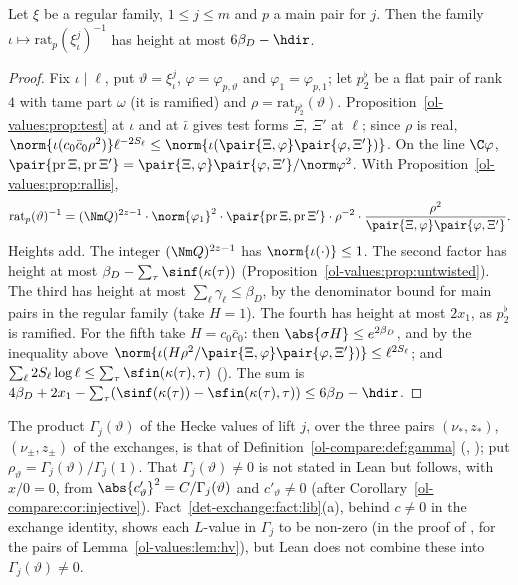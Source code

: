 \begin{theorem}\label{ol-values:thm:invratio}
Let $\xi$ be a regular family, $1\le j\le m$ and $p$ a main pair for $j$. Then the family
$\iota\mapsto\mathrm{rat}_p(\xi_\iota^j)^{-1}$ has height at most $6\beta_D-\hdir$.
\end{theorem}

\begin{proof}
Fix $\iota\mid\ell$, put $\vartheta=\xi_\iota^j$, $\varphi=\varphi_{p,\vartheta}$ and
$\varphi_1=\varphi_{p,1}$; let $p^\flat_2$ be a flat pair of rank $4$ with tame part $\omega$ (it is
ramified) and
$\rho=\mathrm{rat}_{p^\flat_2}(\vartheta)$. Proposition~\ref{ol-values:prop:test} at $\iota$ and at
$\bar\iota$ gives test forms $\Xi$, $\Xi'$ at $\ell$; since $\rho$ is real,
$\norm{\iota(c_0\bar c_0\rho^2)}\ell^{-2S_\ell}\le\norm{\iota(\pair{\Xi,\varphi}\pair{\varphi,\Xi'})}$.
On the line $\C\varphi$, $\pair{\mathrm{pr}\,\Xi,\mathrm{pr}\,\Xi'}=
\pair{\Xi,\varphi}\pair{\varphi,\Xi'}/\norm\varphi^2$. With Proposition~\ref{ol-values:prop:rallis},
\[
\mathrm{rat}_p(\vartheta)^{-1}=(\Nm Q)^{2z-1}\cdot\norm{\varphi_1}^2\cdot
\pair{\mathrm{pr}\,\Xi,\mathrm{pr}\,\Xi'}\cdot\rho^{-2}\cdot
\frac{\rho^2}{\pair{\Xi,\varphi}\pair{\varphi,\Xi'}} .
\]
Heights add. The integer $(\Nm Q)^{2z-1}$ has $\norm{\iota(\cdot)}\le1$. The second factor has height
at most $\beta_D-\sum_\tau\sinf(\kappa(\tau))$ (Proposition~\ref{ol-values:prop:untwisted}). The
third has height at most $\sum_\ell\gamma_\ell\le\beta_D$, by the denominator bound for main pairs
in the regular family (take $H=1$). The fourth has height at most $2x_1$, as $p^\flat_2$ is ramified. For
the fifth take $H=c_0\bar c_0$: then $\abs{\sigma H}\le e^{2\beta_D}$, and by the inequality above
$\norm{\iota(H\rho^2/\pair{\Xi,\varphi}\pair{\varphi,\Xi'})}\le\ell^{2S_\ell}$; and
$\sum_\ell2S_\ell\log\ell\le\sum_\tau\sfin(\kappa(\tau),\tau)$
(). The sum is
$4\beta_D+2x_1-\sum_\tau(\sinf(\kappa(\tau))-\sfin(\kappa(\tau),\tau))\le6\beta_D-\hdir$.
\end{proof}

The product $\Gamma_j(\vartheta)$ of the Hecke values of lift $j$, over the three pairs
$(\nu_*,z_*)$, $(\nu_\pm,z_\pm)$ of the exchanges, is that of Definition~\ref{ol-compare:def:gamma}
(, ); put
$\rho_\vartheta=\Gamma_j(\vartheta)/\Gamma_j(1)$. That $\Gamma_j(\vartheta)\ne0$ is not stated in
Lean but follows, with $x/0=0$, from $\abs{c'_\vartheta}^2=C/\Gamma_j(\vartheta)$ and
$c'_\vartheta\ne0$ (after Corollary~\ref{ol-compare:cor:injective}).
Fact~\ref{det-exchange:fact:lib}(a), behind $c\ne0$ in the exchange identity, shows each $L$-value in
$\Gamma_j$ to be non-zero (in the proof of , for the pairs
of Lemma~\ref{ol-values:lem:hv}), but Lean does not combine these into $\Gamma_j(\vartheta)\ne0$.

